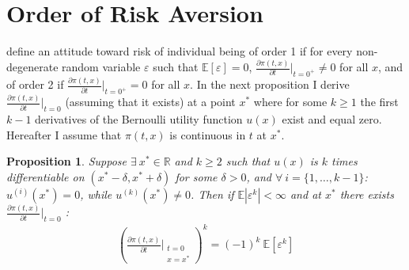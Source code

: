 \documentclass[a4paper]{article}
\newcommand{\expect}{\mathbb{E}}
\newcommand{\eps}{\varepsilon}
\newtheorem{proposition}[theorem]{Proposition}
\begin{document}
\section{Order of Risk Aversion}\label{order}
\cite{segal1990first} define an attitude toward risk of individual being of order 1 if for every non-degenerate random variable $\eps$ such that $\expect[\eps] = 0$, $\frac{\partial \pi(t, x)}{\partial t} \bigg|_{t = 0^+} \neq 0$ for all $x$, and of order 2 if $\frac{\partial \pi(t, x)}{\partial t} \bigg|_{t = 0^+} = 0$ for all $x$. 
In the next proposition I derive $\frac{\partial \pi(t, x)}{\partial t} \bigg|_{t = 0}$ (assuming that it exists) at a point $x^*$ where for some $k\ge 1$ the first $k-1$ derivatives of the Bernoulli utility function $u(x)$ exist and equal zero. Hereafter I assume that $\pi(t, x)$ is continuous in $t$ at $x^*$.
	\begin{proposition}\label{derivative}
		Suppose $\exists\ x^* \in \mathbb{R}$ and $k \ge 2$ such that $u(x)$ is $k$ times differentiable on $(x^*-\delta, x^*+\delta)$ for some $\delta>0$, and $\forall\ i = \{1, \dots, k-1  \}$: $u^{(i)}(x^*) = 0$, while $u^{(k)}(x^*) \neq 0$. Then if $\expect|\eps^k| < \infty$ and at $x^*$ there exists $\frac{\partial \pi(t, x)}{\partial t} \bigg|_{t = 0}$ :
		\begin{align}
			\left( \frac{\partial \pi(t, x)}{\partial t} \Bigg|_{\substack{t = 0\\x = x^*}} \right)^k = (-1)^k\ \expect[\varepsilon^k]
		\end{align}
	\end{proposition}
\end{document}
